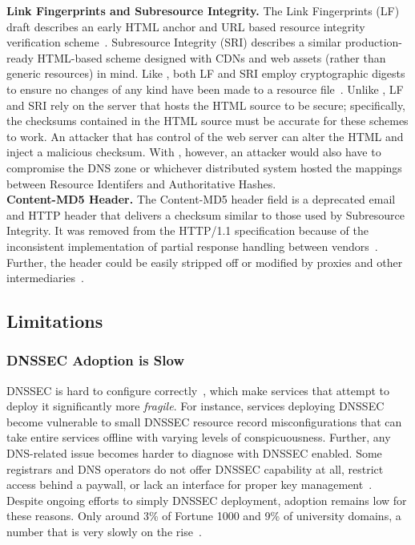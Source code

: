 \noindent\textbf{Link Fingerprints and Subresource Integrity.} The Link
Fingerprints (LF) draft describes an early HTML anchor and URL based resource
integrity verification scheme~\cite{LF}. Subresource Integrity (SRI) describes a
similar production-ready HTML-based scheme designed with CDNs and web assets
(rather than generic resources) in mind. Like \SYSTEM{}, both LF and SRI employ
cryptographic digests to ensure no changes of any kind have been made to a
resource file~\cite{SRI}. Unlike \SYSTEM{}, LF and SRI rely on the server that
hosts the HTML source to be secure; specifically, the checksums contained in the
HTML source must be accurate for these schemes to work. An attacker that has
control of the web server can alter the HTML and inject a malicious checksum.
With \SYSTEM{}, however, an attacker would also have to compromise the DNS zone
or whichever distributed system hosted the mappings between Resource Identifers
and Authoritative Hashes. \\

\noindent\textbf{Content-MD5 Header.} The Content-MD5 header field is a
deprecated email and HTTP header that delivers a checksum similar to those used
by Subresource Integrity. It was removed from the HTTP/1.1 specification because
of the inconsistent implementation of partial response handling between
vendors~\cite{HTTP1.1}. Further, the header could be easily stripped off or
modified by proxies and other intermediaries~\cite{MD5Header}.

\subsection{Limitations}

\subsubsection{DNSSEC Adoption is Slow}

DNSSEC is hard to configure correctly~\cite{DNSSEC-is-hard-1, DNSSEC-is-hard-2,
DNSSEC-is-hard-3, DNSSEC-is-hard-4}, which make services that attempt to deploy
it significantly more \textit{fragile}. For instance, services deploying DNSSEC
become vulnerable to small DNSSEC resource record misconfigurations that can
take entire services offline with varying levels of conspicuousness. Further,
any DNS-related issue becomes harder to diagnose with DNSSEC enabled. Some
registrars and DNS operators do not offer DNSSEC capability at all, restrict
access behind a paywall, or lack an interface for proper key
management~\cite{Cloudflare}. Despite ongoing efforts to simply DNSSEC
deployment, adoption remains low for these reasons. Only around 3\% of Fortune
1000 and 9\% of university domains, a number that is very slowly on the
rise~\cite{NIST}.

